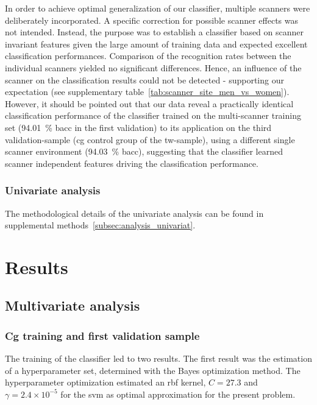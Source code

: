 \documentclass{article}
\begin{document}
    In order to achieve optimal generalization of our classifier, multiple scanners were deliberately incorporated. A specific correction for possible scanner effects was not intended. Instead, the purpose was to establish a classifier based on scanner invariant features given the large amount of training data and expected excellent classification performances. Comparison of the recognition rates between the individual scanners yielded no significant differences. Hence, an influence of the scanner on the classification results could not be detected - supporting our expectation (see supplementary table~\ref{tab:scanner_site_men_vs_women}). However, it should be pointed out that our data reveal a practically identical classification performance of the classifier trained on the multi-scanner training set (\SI{94.01}{\percent} \ac{bacc} in the first validation) to its application on the third validation-sample (\ac{cg} control group of the \ac{tw}-sample), using a different single scanner environment (\SI{94.03}{\percent} \ac{bacc}), suggesting that the classifier learned scanner independent features driving the classification performance.

    \subsubsection{Univariate analysis}
    The methodological details of the univariate analysis can be found in supplemental methods~\ref{subsec:analysis_univariat}.


    \section{Results}

    \subsection{Multivariate analysis}

    \subsubsection{\acl*{Cg} training and first validation sample}
    The training of the classifier led to two results. The first result was the estimation of a hyperparameter set, determined with the Bayes optimization method. The hyperparameter optimization estimated an \ac{rbf} kernel, $C = 27.3$ and $\gamma = 2.4 \times 10^{-5}$ for the \ac{svm} as optimal approximation for the present problem.
\end{document}
